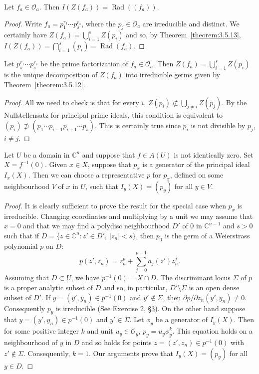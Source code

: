  Let $f_a\in\mathcal O_a$. Then $I(Z(f_a))=\operatorname{Rad}((f_a))$.
\begin{proof}
Write $f_a=p_1^{r_1}\cdots p_s^{r_s}$, where the $p_j\in\mathcal O_a$ are irreducible and distinct. We certainly have $Z(f_a)=\bigcup_{i=1}^s Z(p_i)$ and so, by Theorem~\ref{theorem:3.5.13}, $I(Z(f_a))=\bigcap_{i=1}^s(p_i)=\operatorname{Rad}(f_a)$.
\end{proof}
 Let $p_s^{r_1}\cdots p_s^{r_s}$ be the prime factorization of $f_a\in\mathcal O_a$. Then $Z(f_a)=\bigcup_{i=1}^s Z(p_i)$ is the unique decomposition of $Z(f_a)$ into irreducible germs given by Theorem~\ref{theorem:3.5.12}.
\begin{proof}
All we need to check is that for every $i$, $Z(p_i)\not\subset\bigcup_{j\ne i}Z(p_j)$. By the Nullstellensatz for principal prime ideals, this condition is
equivalent to $(p_i)\not\supset(p_1\cdots p_{i-1}p_{i+1}\cdots p_s)$. This is certainly true since $p_i$ is not divisible by $p_j$, $i\ne j$.
\end{proof}
 Let $U$ be a domain in $\mathbb C^n$ and suppose that $f\in A(U)$ is not identically zero. Set $X=f^{-1}(0)$. Given $x\in X$, suppose that $p_x$ is a generator of the principal ideal $I_x(X)$. Then we can choose a representative $p$ for $p_x$, defined on some neighbourhood $V$ of $x$ in $U$, such that $I_y(X)=(p_y)$ for all $y\in V$.
\begin{proof}
It is clearly sufficient to prove the result for the special case when $p_x$ is irreducible. Changing coordinates and multiplying by a unit we may assume that $x=0$ and that we may find a polydisc neighbourhood $D'$ of $0$ in $\mathbb C^{n-1}$ and $s>0$ such that if $D=\{z\in\mathbb C^n:z'\in D',\ |z_n|<s\}$, then $p_0$ is the germ of a Weierstrass polynomial $p$ on $D$:
\[p(z',z_n)=z_n^p+\sum_{j=0}^{p-1}a_j(z')z_n^j.\]
Assuming that $D\subset U$, we have $p^{-1}(0)=X\cap D$. The discriminant locus $\Sigma$ of $p$ is a proper analytic subset of $D$ and so, in particular, $D'\setminus\Sigma$ is an open dense subset of $D'$. If $y=(y',y_n)\in p^{-1}(0)$ and $y'\notin\Sigma$, then $\partial p/\partial z_n(y',y_n)\ne0$. Consequently $p_y$ is irreducible (See Exercise 2, \hyperref[sec:3:3]{\S3}). On the other hand suppose that $y=(y',y_n)\in p^{-1}(0)$ and $y'\in\Sigma$. Let $\phi_y$ be a generator of $I_y(X)$. Then for some positive integer $k$ and unit $u_y\in\mathcal O_y$, $p_y=u_y\phi_y^k$. This equation holds on a neighbourhood of $y$ in $D$ and so holds for points $z=(z',z_n)\in p^{-1}(0)$ with $z'\notin\Sigma$. Consequently, $k=1$. Our arguments prove that $I_y(X)=(p_y)$ for all $y\in D$.
\end{proof}
